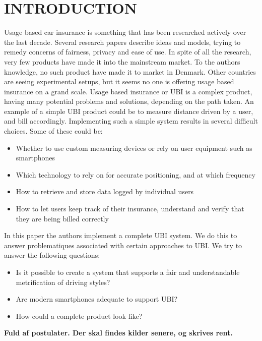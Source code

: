\section{INTRODUCTION}\label{sec:intro}
Usage based car insurance is something that has been researched actively over the last decade. Several research papers describe ideas and models, trying to remedy concerns of fairness, privacy and ease of use. In spite of all the research, very few products have made it into the mainstream market. To the authors knowledge, no such product have made it to market in Denmark. Other countries are seeing experimental setups, but it seems no one is offering usage based insurance on a grand scale.
Usage based insurance or UBI is a complex product, having many potential problems and solutions, depending on the path taken. An example of a simple UBI product could be to measure distance driven by a user, and bill accordingly. Implementing such a simple system results in several difficult choices. Some of these could be:

\begin{itemize}
\item Whether to use custom measuring devices or rely on user equipment such as smartphones
\item Which technology to rely on for accurate positioning, and at which frequency
\item How to retrieve and store data logged by individual users
\item How to let users keep track of their insurance, understand and verify that they are being billed correctly
\end{itemize}

In this paper the authors implement a complete UBI system. We do this to answer problematiques associated with certain approaches to UBI. We try to answer the following questions:

\begin{itemize}
\item Is it possible to create a system that supports a fair and understandable metrification of driving styles?
\item Are modern smartphones adequate to support UBI?
\item How could a complete product look like?
\end{itemize}

\textbf{Fuld af postulater. Der skal findes kilder senere, og skrives rent.}